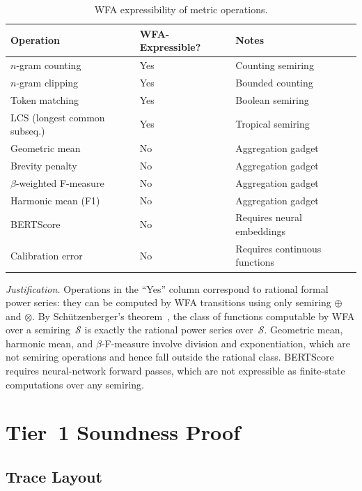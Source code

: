 \documentclass[11pt]{article}
\newcommand{\semiring}[1]{\mathcal{#1}}
\begin{document}
\begin{table}[h]
\centering
\caption{WFA expressibility of metric operations.}\label{tab:expressibility}
\smallskip
\begin{tabular}{@{}lll@{}}
\toprule
\textbf{Operation} & \textbf{WFA-Expressible?} & \textbf{Notes} \\
\midrule
$n$-gram counting    & Yes & Counting semiring \\
$n$-gram clipping    & Yes & Bounded counting \\
Token matching       & Yes & Boolean semiring \\
LCS (longest common subseq.) & Yes & Tropical semiring \\
Geometric mean       & No  & Aggregation gadget \\
Brevity penalty      & No  & Aggregation gadget \\
$\beta$-weighted F-measure & No & Aggregation gadget \\
Harmonic mean (F1)   & No  & Aggregation gadget \\
BERTScore            & No  & Requires neural embeddings \\
Calibration error    & No  & Requires continuous functions \\
\bottomrule
\end{tabular}
\end{table}

\noindent\emph{Justification.}
Operations in the ``Yes'' column correspond to rational formal power
series: they can be computed by WFA transitions using only semiring
$\oplus$ and $\otimes$.  By Sch\"utzenberger's
theorem~\cite{schutzenberger1961}, the class of functions computable
by WFA over a semiring~$\semiring{S}$ is exactly the rational power
series over~$\semiring{S}$.  Geometric mean, harmonic mean, and
$\beta$-F-measure involve division and exponentiation, which are not
semiring operations and hence fall outside the rational class.
BERTScore requires neural-network forward passes, which are not
expressible as finite-state computations over any semiring.


\section{Tier~1 Soundness Proof}\label{app:tier1-proof}

\subsection{Trace Layout}
\end{document}
